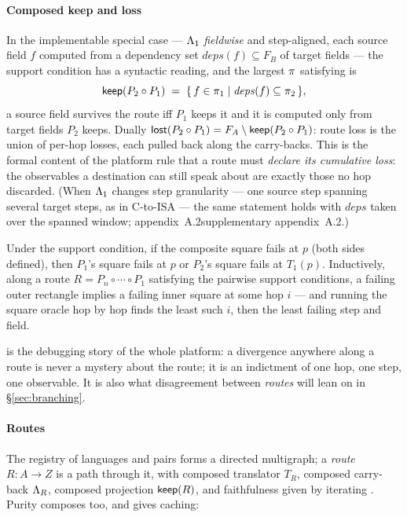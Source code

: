 \paragraph{Composed keep and loss}
In the implementable special case --- $\Lambda_1$ \emph{fieldwise} and
step-aligned, each source field $f$ computed from a dependency set
$\mathit{deps}(f) \subseteq F_B$ of target fields --- the support
condition has a syntactic reading, and the largest $\pi$ satisfying
 is
\[
\mathsf{keep}(P_2 \circ P_1) \;=\;
  \{\, f \in \pi_1 \mid \mathit{deps}(f) \subseteq \pi_2 \,\},
\]
a source field survives the route iff $P_1$ keeps it and it is computed
only from target fields $P_2$ keeps. Dually
$\mathsf{lost}(P_2 \circ P_1) = F_A \setminus \mathsf{keep}(P_2 \circ P_1)$: route loss is
the union of per-hop losses, each pulled back along the carry-backs. This
is the formal content of the platform rule that a route must \emph{declare
its cumulative loss}: the observables a destination can still speak about
are exactly those no hop discarded. (When $\Lambda_1$ changes step
granularity --- one source step spanning several target steps, as in
C-to-ISA --- the same statement holds with $\mathit{deps}$ taken over the
spanned window; \ifarxiv appendix~A.2\else supplementary
appendix~A.2\fi.)

\begin{corollary}[Localization]
\label{cor:localization}
Under the support condition, if the composite square fails at $p$ (both
sides defined), then $P_1$'s square fails at $p$ or $P_2$'s square fails
at $T_1(p)$. Inductively, along a route
$R = P_n \circ \cdots \circ P_1$ satisfying the pairwise support
conditions, a failing outer rectangle implies a failing inner square at
some hop $i$ --- and running the square oracle hop by hop finds the
least such $i$, then the least failing step and field.
\end{corollary}

 is the debugging story of the whole platform: a
divergence anywhere along a route is never a mystery about the route; it
is an indictment of one hop, one step, one observable. It is also what
disagreement between \emph{routes} will lean on in \S\ref{sec:branching}.

\paragraph{Routes}
The registry of languages and pairs forms a directed multigraph; a
\emph{route} $R : A \to Z$ is a path through it, with composed translator
$T_R$, composed carry-back $\Lambda_R$, composed projection $\mathsf{keep}(R)$, and
faithfulness given by iterating . Purity composes too,
and gives caching:

